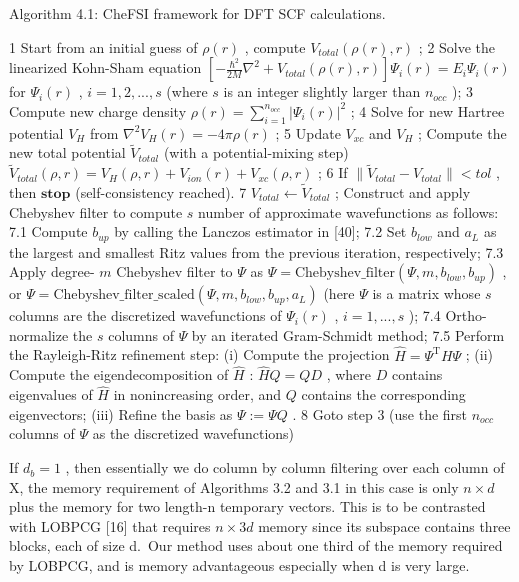 \documentclass[
  10
]{article}
\begin{document}
Algorithm 4.1: CheFSI framework for DFT SCF calculations.

1 Start from an initial guess of \(\rho(r)\) , compute
\(V_{total}(\rho(r), r)\) ; 2 Solve the linearized Kohn-Sham equation
\([- \frac{\hbar^2}{2M} \nabla^2 + V_{total}(\rho(r), r)]\Psi_i(r) = E_i\Psi_i(r)\)
for \(\Psi_i(r)\) , \(i = 1, 2, ..., s\) (where \(s\) is an integer
slightly larger than \(n_{occ}\) ); 3 Compute new charge density
\(\rho(r) = \sum_{i=1}^{n_{occ}} |\Psi_i(r)|^2\) ; 4 Solve for new
Hartree potential \(V_H\) from \(\nabla^2 V_H(r) = -4\pi\rho(r)\) ; 5
Update \(V_{xc}\) and \(V_H\) ; Compute the new total potential
\(\tilde{V}_{total}\) (with a potential-mixing step)
\(\tilde{V}_{total}(\rho, r) = V_H(\rho, r) + V_{ion}(r) + V_{xc}(\rho, r)\)
; 6 If \(\|\tilde{V}_{total} - V_{total}\| < tol\) , then
\(\textbf{stop}\) (self-consistency reached). 7
\(V_{total} \leftarrow \tilde{V}_{total}\) ; Construct and apply
Chebyshev filter to compute \(s\) number of approximate wavefunctions as
follows: 7.1 Compute \(b_{up}\) by calling the Lanczos estimator in
{[}40{]}; 7.2 Set \(b_{low}\) and \(a_L\) as the largest and smallest
Ritz values from the previous iteration, respectively; 7.3 Apply degree-
\(m\) Chebyshev filter to \(\Psi\) as
\(\Psi = \text{Chebyshev\_filter}(\Psi, m, b_{low}, b_{up})\) , or
\(\Psi = \text{Chebyshev\_filter\_scaled}(\Psi, m, b_{low}, b_{up}, a_L)\)
(here \(\Psi\) is a matrix whose \(s\) columns are the discretized
wavefunctions of \(\Psi_i(r)\) , \(i = 1, ..., s\) ); 7.4
Ortho-normalize the \(s\) columns of \(\Psi\) by an iterated
Gram-Schmidt method; 7.5 Perform the Rayleigh-Ritz refinement step: (i)
Compute the projection \(\hat{H} = \Psi^{\mathrm{T}} H \Psi\) ; (ii)
Compute the eigendecomposition of \(\hat{H}\) : \(\hat{H} Q = Q D\) ,
where \(D\) contains eigenvalues of \(\hat{H}\) in nonincreasing order,
and \(Q\) contains the corresponding eigenvectors; (iii) Refine the
basis as \(\Psi := \Psi Q\) . 8 Goto step 3 (use the first \(n_{occ}\)
columns of \(\Psi\) as the discretized wavefunctions)

If \(d _ { b } = 1\) , then essentially we do column by column filtering
over each column of X, the memory requirement of Algorithms 3.2 and 3.1
in this case is only \(n \times d\) plus the memory for two length-n
temporary vectors. This is to be contrasted with LOBPCG {[}16{]} that
requires \(n \times 3 d\) memory since its subspace contains three
blocks, each of size d.~Our method uses about one third of the memory
required by LOBPCG, and is memory advantageous especially when d is very
large.
\end{document}

